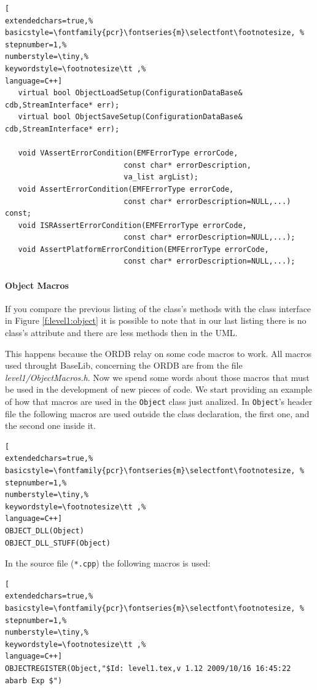 \begin{lstlisting}[
extendedchars=true,%
basicstyle=\fontfamily{pcr}\fontseries{m}\selectfont\footnotesize, %
stepnumber=1,%
numberstyle=\tiny,%
keywordstyle=\footnotesize\tt ,%
language=C++]
   virtual bool ObjectLoadSetup(ConfigurationDataBase& cdb,StreamInterface* err);
   virtual bool ObjectSaveSetup(ConfigurationDataBase& cdb,StreamInterface* err);

   void VAssertErrorCondition(EMFErrorType errorCode,
                           const char* errorDescription,
                           va_list argList);
   void AssertErrorCondition(EMFErrorType errorCode,
                           const char* errorDescription=NULL,...) const;
   void ISRAssertErrorCondition(EMFErrorType errorCode,
                           const char* errorDescription=NULL,...);
   void AssertPlatformErrorCondition(EMFErrorType errorCode,
                           const char* errorDescription=NULL,...);
\end{lstlisting}


\paragraph{Object Macros}
If you compare the previous listing of the class's methods with the class interface in Figure \ref{f:level1:object} it is  possible to note that in our last listing there is no class's attribute and there are less methods then in the UML.

This happens because the ORDB relay on some code macros to work. All macros used throught BaseLib, concerning the ORDB are from the file \textit{level1/ObjectMacros.h}. Now we spend some words about those macros that must be used in the development of new pieces of code. We start providing an example of how that macros are used in the \texttt{Object} class just analized. In \texttt{Object}'s header file the following macros are used outside the class declaration, the first one, and the second one inside it.

\begin{lstlisting}[
extendedchars=true,%
basicstyle=\fontfamily{pcr}\fontseries{m}\selectfont\footnotesize, %
stepnumber=1,%
numberstyle=\tiny,%
keywordstyle=\footnotesize\tt ,%
language=C++]
OBJECT_DLL(Object)
OBJECT_DLL_STUFF(Object)
\end{lstlisting}

In the source file (\texttt{*.cpp}) the following macros is used:

\begin{lstlisting}[
extendedchars=true,%
basicstyle=\fontfamily{pcr}\fontseries{m}\selectfont\footnotesize, %
stepnumber=1,%
numberstyle=\tiny,%
keywordstyle=\footnotesize\tt ,%
language=C++]
OBJECTREGISTER(Object,"$Id: level1.tex,v 1.12 2009/10/16 16:45:22 abarb Exp $")
\end{lstlisting}

